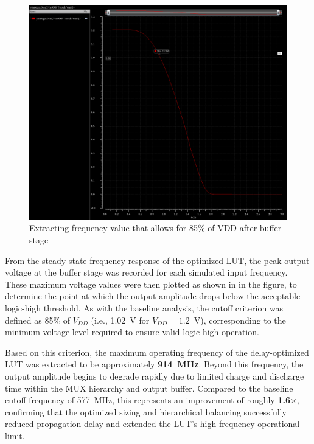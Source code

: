 \documentclass[12pt]{article}
\begin{document}
\begin{figure}[H]
    \centering
    \includegraphics[width=\linewidth]{writeup//figures/max_frequencies_optimized.png}
    \caption{Extracting frequency value that allows for 85\% of VDD after buffer stage}
\end{figure}
From the steady-state frequency response of the optimized LUT, the peak output voltage at the buffer stage was recorded for each simulated input frequency. These maximum voltage values were then plotted as shown in in the figure, to determine the point at which the output amplitude drops below the acceptable logic-high threshold. As with the baseline analysis, the cutoff criterion was defined as 85\% of $V_{DD}$ (i.e., 1.02~V for $V_{DD}=1.2$~V), corresponding to the minimum voltage level required to ensure valid logic-high operation.

Based on this criterion, the maximum operating frequency of the delay-optimized LUT was extracted to be approximately \textbf{914~MHz}. Beyond this frequency, the output amplitude begins to degrade rapidly due to limited charge and discharge time within the MUX hierarchy and output buffer. Compared to the baseline cutoff frequency of 577~MHz, this represents an improvement of roughly \textbf{1.6$\times$}, confirming that the optimized sizing and hierarchical balancing successfully reduced propagation delay and extended the LUT’s high-frequency operational limit.


\newpage

\end{document}

